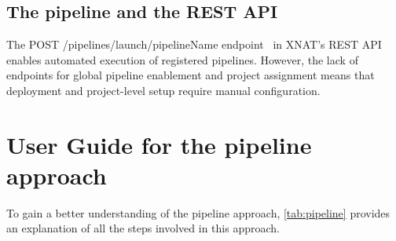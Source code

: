 \normalsize



\subsection{The pipeline and the REST API}


The POST /pipelines/launch/pipelineName endpoint~\cite{pipelinerestapi} in XNAT's REST API
 enables automated execution of registered pipelines. However, the lack of endpoints for global pipeline enablement and project assignment means that deployment and project-level setup require manual configuration.

\section{User Guide for the pipeline approach}
To gain a better understanding of the pipeline approach, \autoref{tab:pipeline} provides an explanation of all the steps involved in this approach.
